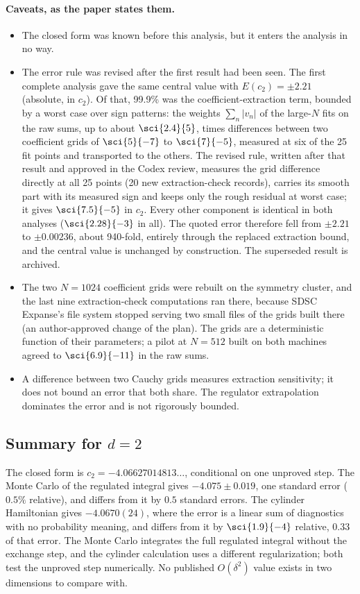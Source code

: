 \paragraph{Caveats, as the paper states them.}
\begin{itemize}
\item The closed form was known before this analysis, but it enters the analysis in no way.
\item The error rule was revised after the first result had been seen. The first complete analysis gave the same
 central value with $E(c_2)=\pm2.21$ (absolute, in $c_2$). Of that, 99.9\% was the coefficient-extraction term,
 bounded by a worst case over sign patterns: the weights $\sum_n|v_n|$ of the large-$N$ fits on the raw sums, up to
 about $\sci{2.4}{5}$, times differences between two coefficient grids of $\sci{5}{-7}$ to $\sci{7}{-5}$, measured at six of the 25 fit points and transported
 to the others. The revised rule, written after that result and approved in the Codex review, measures the grid
 difference directly at all 25 points (20 new extraction-check records), carries its smooth part with its measured
 sign and keeps only the rough residual at worst case; it gives $\sci{7.5}{-5}$ in $c_2$. Every other component is
 identical in both analyses ($\sci{2.28}{-3}$ in all). The quoted error therefore fell from $\pm2.21$ to $\pm0.00236$,
 about 940-fold, entirely through the replaced extraction bound, and the central value is unchanged by construction.
 The superseded result is archived.
\item The two $N=1024$ coefficient grids were rebuilt on the symmetry cluster, and the last nine extraction-check
 computations ran there, because SDSC Expanse's file system stopped serving two small files of the grids built there
 (an author-approved change of the plan). The grids are a deterministic function of their parameters; a pilot at
 $N=512$ built on both machines agreed to $\sci{6.9}{-11}$ in the raw sums.
\item A difference between two Cauchy grids measures extraction sensitivity; it does not bound an error that both
 share. The regulator extrapolation dominates the error and is not rigorously bounded.
\end{itemize}

\subsection{Summary for \texorpdfstring{$d=2$}{d=2}}
The closed form is $c_2=-4.06627014813\ldots$, conditional on one unproved step. The Monte Carlo of the regulated
integral gives $-4.075\pm0.019$, one standard error ($0.5\%$ relative), and differs from it by $0.5$ standard errors.
The cylinder Hamiltonian gives $-4.0670(24)$, where the error is a linear sum of diagnostics with no probability
meaning, and differs from it by $\sci{1.9}{-4}$ relative, 0.33 of that error. The Monte Carlo integrates the
full regulated integral without the exchange step, and the cylinder calculation uses a different regularization; both
test the unproved step numerically. No published $O(\delta^2)$ value exists in two dimensions to
compare with.

